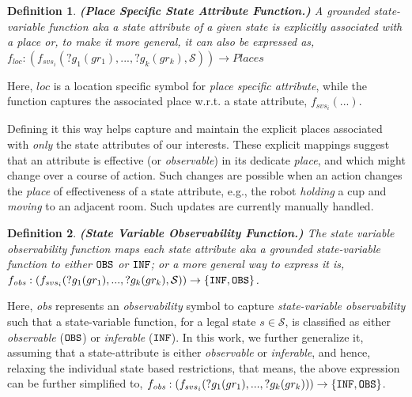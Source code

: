 \documentclass[letterpaper]{article} %
\newtheorem{definition}{Definition}
\begin{document}

\begin{definition}
    \textbf{(Place Specific State Attribute Function.)} A {\em grounded} state-variable function {\em aka} a state attribute of a given state is explicitly associated with a place or, to make it more general, it can also be expressed as, $f_{loc}: (f_{svs_i}(?g_1(gr_1),...,?g_k(gr_k),\mathcal{S})) \rightarrow 
    Places$
    \label{def:pssav}
\end{definition}
Here, $\mathit{loc}$ is a location specific symbol for {\em place specific attribute}, while the function captures the associated place w.r.t. a state attribute, $f_{svs_i}(...)$.

Defining it this way helps capture and maintain the explicit places associated with \textit{only} the state attributes of our interests. 
These explicit mappings suggest that an attribute is effective (or \textit{observable}) in its dedicate \textit{place}, and which might change over a course of action. 
Such changes are possible when an action changes the \textit{place} of effectiveness of a state attribute, e.g., the robot \textit{holding} a cup and \textit{moving} to an adjacent room. Such updates are currently manually handled.


\begin{definition}
\textbf{(State Variable Observability Function.)} 
The state variable observability function maps each state attribute {\em aka} a grounded \textit{state-variable function} 
to either $\texttt{OBS}$ or $\texttt{INF}$; or a more general way to express it is, $f_{\textit{obs}}: (f_{svs_i}(?g_1(gr_1),...,?g_k(gr_k),\mathcal{S}
)) \rightarrow 
    \{\texttt{INF}, \texttt{OBS}\}$.
    \label{def:svof}
\end{definition}
Here, \textit{obs} represents an \textit{observability} symbol to capture \textit{state-variable observability} such that a state-variable function, for a legal state $s\in\mathcal{S}$, is classified as either \textit{observable} ($\texttt{OBS}$) or \textit{inferable} ($\texttt{INF}$). 
In this work, we further generalize it, assuming that a state-attribute is either \textit{observable} or \textit{inferable}, and hence, relaxing the individual state based restrictions, that means, the above expression can be further simplified to, $f_{\textit{obs}}: (f_{svs_i}(?g_1(gr_1),...,?g_k(gr_k))) \rightarrow 
    \{\texttt{INF}, \texttt{OBS}\}$.
\end{document}
